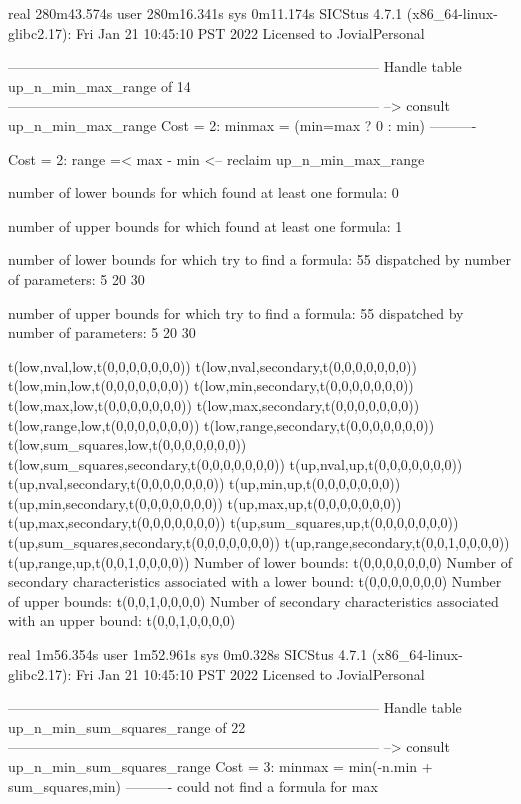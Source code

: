 real	280m43.574s
user	280m16.341s
sys	0m11.174s
SICStus 4.7.1 (x86_64-linux-glibc2.17): Fri Jan 21 10:45:10 PST 2022
Licensed to JovialPersonal


--------------------------------------------------------------------------------
Handle table up_n_min_max_range of 14
--------------------------------------------------------------------------------
--> consult up_n_min_max_range
Cost =  2:  minmax = (min=max ? 0 : min)
----------

Cost =  2:  range =< max - min
<-- reclaim up_n_min_max_range

number of lower bounds for which found at least one formula: 0

number of upper bounds for which found at least one formula: 1

number of lower bounds for which try to find a formula: 55
dispatched by number of parameters: 5  20  30

number of upper bounds for which try to find a formula: 55
dispatched by number of parameters: 5  20  30

t(low,nval,low,t(0,0,0,0,0,0,0))
t(low,nval,secondary,t(0,0,0,0,0,0,0))
t(low,min,low,t(0,0,0,0,0,0,0))
t(low,min,secondary,t(0,0,0,0,0,0,0))
t(low,max,low,t(0,0,0,0,0,0,0))
t(low,max,secondary,t(0,0,0,0,0,0,0))
t(low,range,low,t(0,0,0,0,0,0,0))
t(low,range,secondary,t(0,0,0,0,0,0,0))
t(low,sum_squares,low,t(0,0,0,0,0,0,0))
t(low,sum_squares,secondary,t(0,0,0,0,0,0,0))
t(up,nval,up,t(0,0,0,0,0,0,0))
t(up,nval,secondary,t(0,0,0,0,0,0,0))
t(up,min,up,t(0,0,0,0,0,0,0))
t(up,min,secondary,t(0,0,0,0,0,0,0))
t(up,max,up,t(0,0,0,0,0,0,0))
t(up,max,secondary,t(0,0,0,0,0,0,0))
t(up,sum_squares,up,t(0,0,0,0,0,0,0))
t(up,sum_squares,secondary,t(0,0,0,0,0,0,0))
t(up,range,secondary,t(0,0,1,0,0,0,0))
t(up,range,up,t(0,0,1,0,0,0,0))
Number of lower bounds:                                             t(0,0,0,0,0,0,0)
Number of secondary characteristics associated with a lower bound:  t(0,0,0,0,0,0,0)
Number of upper bounds:                                             t(0,0,1,0,0,0,0)
Number of secondary characteristics associated with an upper bound: t(0,0,1,0,0,0,0)

real	1m56.354s
user	1m52.961s
sys	0m0.328s
SICStus 4.7.1 (x86_64-linux-glibc2.17): Fri Jan 21 10:45:10 PST 2022
Licensed to JovialPersonal


--------------------------------------------------------------------------------
Handle table up_n_min_sum_squares_range of 22
--------------------------------------------------------------------------------
--> consult up_n_min_sum_squares_range
Cost =  3:  minmax = min(-n.min + sum_squares,min)
----------
could not find a formula for max

